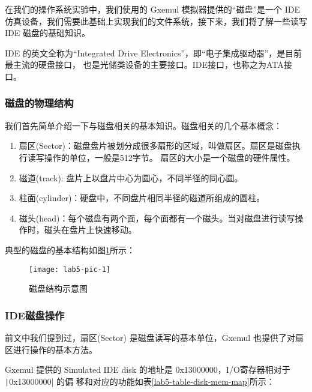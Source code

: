 在我们的操作系统实验中，我们使用的 Gxemul 模拟器提供的“磁盘”是一个 IDE 仿真设备，我们需要此基础上实现我们的文件系统，接下来，我们将了解一些读写 IDE 磁盘的基础知识。

\begin{note}
IDE 的英文全称为“Integrated Drive Electronics”，即“电子集成驱动器”，是目前最主流的硬盘接口， 也是光储类设备的主要接口。IDE接口，也称之为ATA接口。
\end{note}

\subsubsection{磁盘的物理结构}

我们首先简单介绍一下与磁盘相关的基本知识。磁盘相关的几个基本概念：

\begin{enumerate}
  \item 扇区(Sector)：磁盘盘片被划分成很多扇形的区域，叫做扇区。扇区是磁盘执行读写操作的单位，一般是512字节。
  扇区的大小是一个磁盘的硬件属性。
  \item 磁道(track): 盘片上以盘片中心为圆心，不同半径的同心圆。
  \item 柱面(cylinder)：硬盘中，不同盘片相同半径的磁道所组成的圆柱。
  \item 磁头(head)：每个磁盘有两个面，每个面都有一个磁头。当对磁盘进行读写操作时，磁头在盘片上快速移动。
\end{enumerate}

典型的磁盘的基本结构如图\ref{lab5-pic-1}所示：

\begin{figure}[htbp]
  \centering
  \texttt{[image: lab5-pic-1]}
  \caption{磁盘结构示意图}\label{lab5-pic-1}
\end{figure}

\subsubsection{IDE磁盘操作}

前文中我们提到过，扇区(Sector)
是磁盘读写的基本单位，Gxemul 也提供了对扇区进行操作的基本方法。

Gxemul 提供的 Simulated IDE disk 的地址是 0x13000000，I/O寄存器相对于 \texttt|0x13000000| 的偏
移和对应的功能如表\ref{lab5-table-disk-mem-map}所示：

